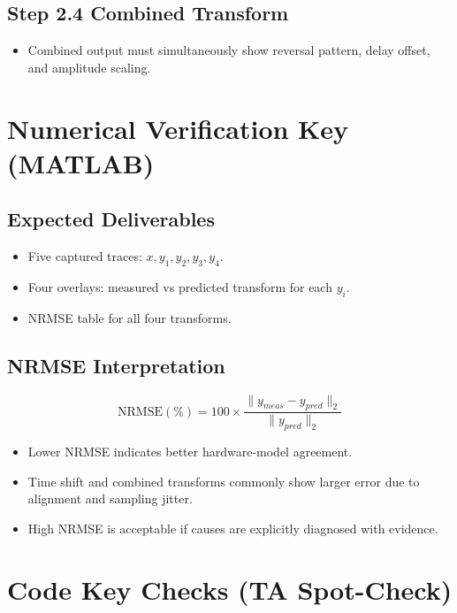 \documentclass[11pt,letterpaper]{article}
\begin{document}
\subsection*{Step 2.4 Combined Transform}
\begin{itemize}[leftmargin=1.2em]
    \item Combined output must simultaneously show reversal pattern, delay offset, and amplitude scaling.
\end{itemize}

\section{Numerical Verification Key (MATLAB)}

\subsection*{Expected Deliverables}
\begin{itemize}[leftmargin=1.2em]
    \item Five captured traces: $x,y_1,y_2,y_3,y_4$.
    \item Four overlays: measured vs predicted transform for each $y_i$.
    \item NRMSE table for all four transforms.
\end{itemize}

\subsection*{NRMSE Interpretation}
\[
\mathrm{NRMSE}(\%) = 100\times\frac{\|y_{meas}-y_{pred}\|_2}{\|y_{pred}\|_2}
\]

\begin{itemize}[leftmargin=1.2em]
    \item Lower NRMSE indicates better hardware-model agreement.
    \item Time shift and combined transforms commonly show larger error due to alignment and sampling jitter.
    \item High NRMSE is acceptable if causes are explicitly diagnosed with evidence.
\end{itemize}

\section{Code Key Checks (TA Spot-Check)}
\end{document}
